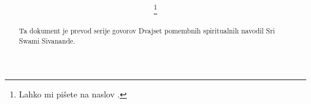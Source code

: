 \documentclass[12pt,a4paper]{article}
\title{
	\vspace{-15mm}
	\fontsize{24pt}{10pt}\textbf{\naslov}	%
}
\author{
\large
\textsc{\avtor}\thanks{Lahko mi pišete na naslov \avtorEmail.}
}
\date{}
\begin{document}
\maketitle %
\thispagestyle{fancy} %

\begin{abstract}
    \noindent Ta dokument je prevod serije govorov Dvajset pomembnih spiritualnih navodil Sri Swami Sivanande.
\end{abstract}



\tableofcontents


%

%



%
%


\end{document}
